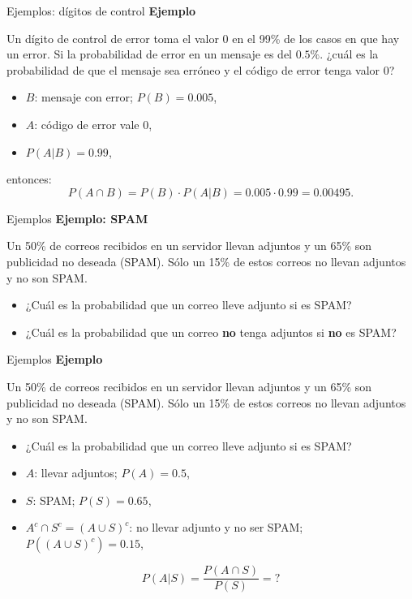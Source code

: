 \documentclass[
  ignorenonframetext,
  aspectratio=169]{beamer}
\providecommand{\tightlist}{%
  \setlength{\itemsep}{0pt}\setlength{\parskip}{0pt}}\usepackage{longtable,booktabs,array}
\begin{document}
\begin{frame}{Ejemplos: dígitos de control}
\label{ejemplos-duxedgitos-de-control}
\textbf{Ejemplo}

Un dígito de control de error toma el valor 0 en el 99\% de los casos en
que hay un error. Si la probabilidad de error en un mensaje es del
\(0.5\%\). ¿cuál es la probabilidad de que el mensaje sea erróneo y el
código de error tenga valor 0?

\begin{itemize}
\tightlist
\item
  \(B\): mensaje con error; \(P(B)=0.005\),
\item
  \(A\): código de error vale 0,
\item
  \(P(A|B)=0.99\),
\end{itemize}

entonces: \[P(A\cap B)=P(B)\cdot P(A|B)=0.005\cdot 0.99=0.00495.\]
\end{frame}

\begin{frame}{Ejemplos}
\label{ejemplos}
\textbf{Ejemplo: SPAM}

Un 50\% de correos recibidos en un servidor llevan adjuntos y un 65\%
son publicidad no deseada (SPAM). Sólo un 15\% de estos correos no
llevan adjuntos y no son SPAM.

\begin{itemize}
\tightlist
\item
  ¿Cuál es la probabilidad que un correo lleve adjunto si es SPAM?
\item
  ¿Cuál es la probabilidad que un correo \textbf{no} tenga adjuntos si
  \textbf{no} es SPAM?
\end{itemize}
\end{frame}

\begin{frame}{Ejemplos}
\label{ejemplos-1}
\textbf{Ejemplo}

Un 50\% de correos recibidos en un servidor llevan adjuntos y un 65\%
son publicidad no deseada (SPAM). Sólo un 15\% de estos correos no
llevan adjuntos y no son SPAM.

\begin{itemize}
\tightlist
\item
  ¿Cuál es la probabilidad que un correo lleve adjunto si es SPAM?
\end{itemize}

\begin{itemize}
\tightlist
\item
  \(A\): llevar adjuntos; \(P(A)=0.5\),
\item
  \(S\): SPAM; \(P(S)=0.65\),
\item
  \(A^c\cap S^c=(A\cup S)^c\): no llevar adjunto y no ser SPAM;
  \(P((A\cup S)^c)=0.15\),
\end{itemize}

\[P(A|S)=\dfrac{P(A\cap S)}{P(S)}=?\]
\end{frame}
\end{document}
